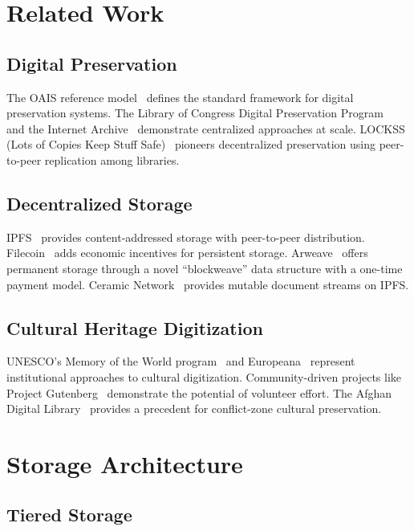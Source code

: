 \documentclass[11pt,a4paper]{article}
\begin{document}
\section{Related Work}

\subsection{Digital Preservation}

The OAIS reference model~\citep{iso14721} defines the standard framework for digital preservation systems. The Library of Congress Digital Preservation Program~\citep{loc2023digital} and the Internet Archive~\citep{kahle1996internet} demonstrate centralized approaches at scale. LOCKSS (Lots of Copies Keep Stuff Safe)~\citep{reich2001lockss} pioneers decentralized preservation using peer-to-peer replication among libraries.

\subsection{Decentralized Storage}

IPFS~\citep{benet2014ipfs} provides content-addressed storage with peer-to-peer distribution. Filecoin~\citep{protocollabs2017filecoin} adds economic incentives for persistent storage. Arweave~\citep{williams2019arweave} offers permanent storage through a novel ``blockweave'' data structure with a one-time payment model. Ceramic Network~\citep{ceramic2021} provides mutable document streams on IPFS.

\subsection{Cultural Heritage Digitization}

UNESCO's Memory of the World program~\citep{unesco2023memory} and Europeana~\citep{europeana2023} represent institutional approaches to cultural digitization. Community-driven projects like Project Gutenberg~\citep{hart1992gutenberg} demonstrate the potential of volunteer effort. The Afghan Digital Library~\citep{nyu2020afghan} provides a precedent for conflict-zone cultural preservation.

\section{Storage Architecture}

\subsection{Tiered Storage}
\end{document}
